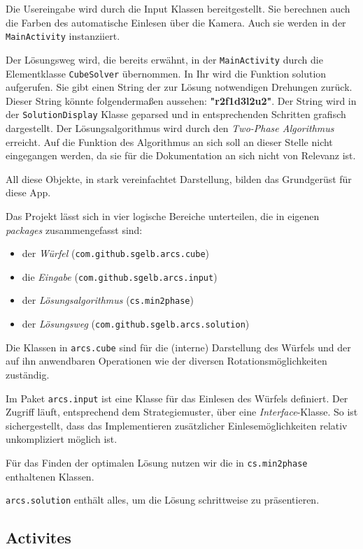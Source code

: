 Die Usereingabe wird durch die Input Klassen bereitgestellt. Sie berechnen auch
die Farben des automatische Einlesen über die Kamera. Auch sie werden in der
\texttt{MainActivity} instanziiert.

Der Lösungsweg wird, die bereits erwähnt, in der \texttt{MainActivity} durch die Elementklasse \texttt{CubeSolver}
übernommen. In Ihr wird die Funktion solution aufgerufen. Sie gibt einen String der zur
Lösung notwendigen Drehungen zurück. Dieser String könnte folgendermaßen aussehen: \textbf{"r2f1d3l2u2"}. Der String wird
in der \texttt{SolutionDisplay} Klasse geparsed und in entsprechenden Schritten grafisch dargestellt.
Der Lösungsalgorithmus wird durch den \emph{Two-Phase Algorithmus} erreicht. Auf die Funktion des Algorithmus
an sich soll an dieser Stelle nicht eingegangen werden, da sie für die Dokumentation an sich nicht von Relevanz ist.

All diese Objekte, in stark vereinfachtet Darstellung, bilden das Grundgerüst
für diese App.

Das Projekt lässt sich in vier logische Bereiche unterteilen, die in eigenen
\emph{packages} zusammengefasst sind:

\begin{itemize}
  \item der \emph{Würfel} (\texttt{com.github.sgelb.arcs.cube})
  \item die \emph{Eingabe} (\texttt{com.github.sgelb.arcs.input})
  \item der \emph{Lösungsalgorithmus} (\texttt{cs.min2phase})
  \item der \emph{Lösungsweg} (\texttt{com.github.sgelb.arcs.solution})
\end{itemize}

Die Klassen in \texttt{arcs.cube} sind für die (interne) Darstellung des Würfels
und der auf ihn anwendbaren Operationen wie der diversen Rotationsmöglichkeiten
zuständig.

Im Paket \texttt{arcs.input} ist eine Klasse für das Einlesen des Würfels
definiert. Der Zugriff läuft, entsprechend dem Strategiemuster, über eine
\emph{Interface}-Klasse. So ist sichergestellt, dass das Implementieren
zusätzlicher Einlesemöglichkeiten relativ unkompliziert möglich ist.

Für das Finden der optimalen Lösung nutzen wir die in \texttt{cs.min2phase}
enthaltenen Klassen.

\texttt{arcs.solution} enthält alles, um die Lösung schrittweise zu
präsentieren.

\subsection{Activites}

